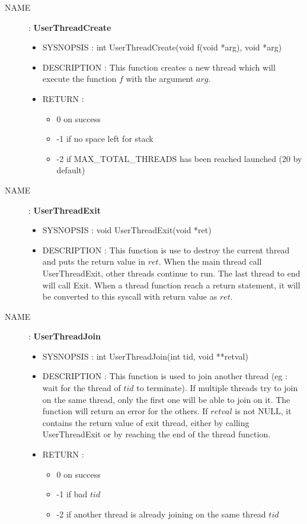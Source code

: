 \begin{description}
    \item [NAME] : \textbf{UserThreadCreate}
        \begin{itemize}
            \item SYSNOPSIS : int UserThreadCreate(void f(void *arg), void *arg)
            \item DESCRIPTION :
                This function creates a new thread which will execute the function $f$ with the
                argument $arg$.
            \item RETURN :
                \begin{itemize}
                    \item 0 on success
                    \item -1 if no space left for stack
                    \item -2 if MAX\_TOTAL\_THREADS has been reached launched (20 by default)
                \end{itemize}
        \end{itemize}


    \item [NAME] : \textbf{UserThreadExit}
        \begin{itemize}
            \item SYSNOPSIS : void UserThreadExit(void *ret)
            \item DESCRIPTION :
                This function is use to destroy the current thread and puts the return value in
                $ret$.
                When the main thread call UserThreadExit, other threads continue to
                run. The last thread to end will call Exit.
                When a thread function reach a return statement, it will be converted
                to this syscall with return value as $ret$.
        \end{itemize}

    \item [NAME] : \textbf{UserThreadJoin}
        \begin{itemize}
            \item SYSNOPSIS : int UserThreadJoin(int tid, void **retval)
            \item DESCRIPTION :
                This function is used to join another thread (eg : wait for the thread
                of $tid$ to terminate). If multiple threads try to join on the same
                thread, only the first one will be able to join on it. The function
                will return an error for the others.
                If $retval$ is not NULL, it contains the return value of exit thread,
                either by calling UserThreadExit or by reaching the end of the thread function.
            \item RETURN :
                \begin{itemize}
                    \item 0 on success
                    \item -1 if bad $tid$
                    \item -2 if another thread is already joining on the same thread $tid$
                \end{itemize}
        \end{itemize}


\end{description}
